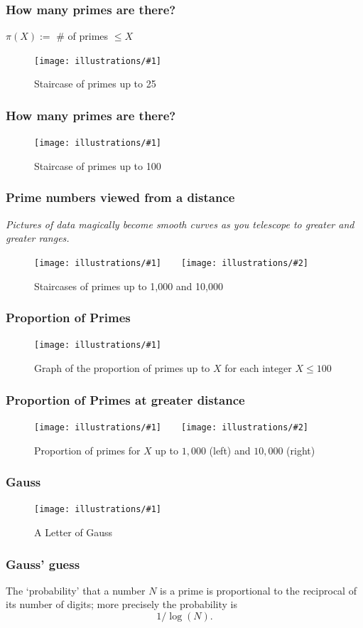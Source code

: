 \documentclass{beamer}
\newcommand{\ill}[3]{%
   \begin{figure}[H]%
   \vspace{-2ex}
   \centering%
   \texttt{[image: illustrations/\#1]}%
   \caption{#3}%
   \vspace{-2ex}
    \end{figure}}
\newcommand{\illtwo}[4]{%
   \begin{figure}[H]\centering%
   \texttt{[image: illustrations/\#1]}$\qquad$\texttt{[image: illustrations/\#2]}%
   \caption{#4}%
    \end{figure}}
\begin{document}
\begin{frame}\frametitle{\bf How many primes are there?}
\vskip20pt

{\Huge $\pi(X):=$ \# of primes  $\le X$}
\vskip10pt

\ill{prime_pi_25_aspect1}{.8}{Staircase of primes up to 25\label{fig:staircase25}}\end{frame}
\begin{frame}\frametitle{\bf How many primes are there?}
\vskip20pt
\ill{prime_pi_100_aspect1}{.8}{Staircase of primes up to 100\label{fig:staircase100a}}

\end{frame}


\begin{frame}\frametitle{\bf Prime numbers viewed from a distance}
\vskip10pt
 {\Huge{\it Pictures of data magically become smooth curves as you telescope to greater and greater ranges.}}
\vskip20pt


\illtwo{prime_pi_1000}{prime_pi_10000}{0.4}{Staircases of primes up to 1,000 and 10,000\label{fig:staircases2}}
\end{frame}


\begin{frame}\frametitle{\bf Proportion of Primes}\vskip10pt
\ill{proportion_primes_100}{1}{Graph of the proportion of primes up to $X$ for each integer $X\leq 100$}
\end{frame}


\begin{frame}\frametitle{\bf Proportion of Primes at greater distance}\vskip10pt

\illtwo{proportion_primes_1000}{proportion_primes_10000}{0.46}{Proportion of primes for $X$ up to $1{,}000$ (left) and $10{,}000$ (right)}
\end{frame}




\begin{frame}\frametitle{\bf Gauss}\vskip10pt

\ill{gauss_tables_half}{.9}{A Letter of Gauss\label{fig:gauss_letter}}\end{frame}

\begin{frame}\frametitle{\bf Gauss' guess}\vskip10pt

{\Huge The `probability' that a number $N$ is a prime  is proportional to the reciprocal of its number of digits; more precisely the probability is
\vskip10pt $$1/\log(N).$$}\end{frame}
\end{document}
